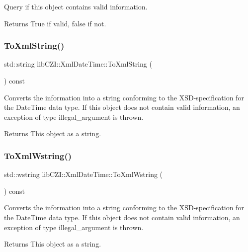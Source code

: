 Query if this object contains valid information. \begin{DoxyReturn}{Returns}
True if valid, false if not. 
\end{DoxyReturn}
\mbox{\label{structlib_c_z_i_1_1_xml_date_time_a0ecc73d0509f050a291817fd7e4c4e6d}} 
\subsubsection{\texorpdfstring{To\+Xml\+String()}{ToXmlString()}}
{\footnotesize\ttfamily std\+::string lib\+C\+Z\+I\+::\+Xml\+Date\+Time\+::\+To\+Xml\+String (\begin{DoxyParamCaption}{ }\end{DoxyParamCaption}) const}

Converts the information into a string conforming to the X\+S\+D-\/specification for the Date\+Time data type. If this object does not contain valid information, an exception of type illegal\+\_\+argument is thrown. \begin{DoxyReturn}{Returns}
This object as a string. 
\end{DoxyReturn}
\mbox{\label{structlib_c_z_i_1_1_xml_date_time_a98d5f56db50d7ae8b269dafb18f620a8}} 
\subsubsection{\texorpdfstring{To\+Xml\+Wstring()}{ToXmlWstring()}}
{\footnotesize\ttfamily std\+::wstring lib\+C\+Z\+I\+::\+Xml\+Date\+Time\+::\+To\+Xml\+Wstring (\begin{DoxyParamCaption}{ }\end{DoxyParamCaption}) const}

Converts the information into a string conforming to the X\+S\+D-\/specification for the Date\+Time data type. If this object does not contain valid information, an exception of type illegal\+\_\+argument is thrown. \begin{DoxyReturn}{Returns}
This object as a string. 
\end{DoxyReturn}
\mbox{\label{structlib_c_z_i_1_1_xml_date_time_acde177dc8ddb80c6e831645a7d2fd276}} 

